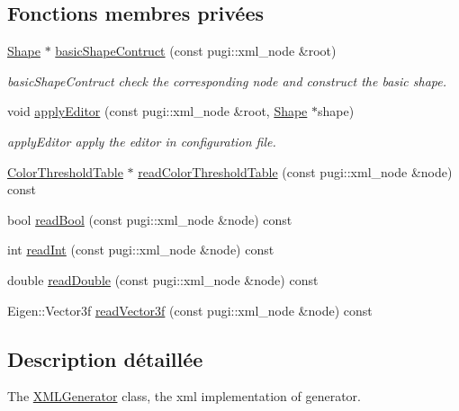 \subsection*{Fonctions membres privées}
\begin{DoxyCompactItemize}
\item 
\hyperlink{class_shape}{Shape} $\ast$ \hyperlink{class_x_m_l_generator_acbd95e69a36222e6f8906a77e6530f1b}{basic\+Shape\+Contruct} (const pugi\+::xml\+\_\+node \&root)
\begin{DoxyCompactList}\small\item\em basic\+Shape\+Contruct check the corresponding node and construct the basic shape. \end{DoxyCompactList}\item 
void \hyperlink{class_x_m_l_generator_a3bd445a70b67303cf5539212ed58928d}{apply\+Editor} (const pugi\+::xml\+\_\+node \&root, \hyperlink{class_shape}{Shape} $\ast$shape)
\begin{DoxyCompactList}\small\item\em apply\+Editor apply the editor in configuration file. \end{DoxyCompactList}\item 
\hyperlink{thresholdtable_8h_ab0deb49d07758f9814993774cb9935cc}{Color\+Threshold\+Table} $\ast$ \hyperlink{class_x_m_l_generator_a4df5b09d456665f90f1c2e0818ccd442}{read\+Color\+Threshold\+Table} (const pugi\+::xml\+\_\+node \&node) const
\item 
bool \hyperlink{class_x_m_l_generator_a0030450c03ad82fe328e27382bcfe011}{read\+Bool} (const pugi\+::xml\+\_\+node \&node) const
\item 
int \hyperlink{class_x_m_l_generator_a0254cdb59750801014903ed7a4169827}{read\+Int} (const pugi\+::xml\+\_\+node \&node) const
\item 
double \hyperlink{class_x_m_l_generator_ab0a3198e6d44dcf102e13902325e0bd1}{read\+Double} (const pugi\+::xml\+\_\+node \&node) const
\item 
Eigen\+::\+Vector3f \hyperlink{class_x_m_l_generator_abf2e3d3b2d44fdd1e01d0f2bbca7f028}{read\+Vector3f} (const pugi\+::xml\+\_\+node \&node) const
\end{DoxyCompactItemize}


\subsection{Description détaillée}
The \hyperlink{class_x_m_l_generator}{X\+M\+L\+Generator} class, the xml implementation of generator. 

